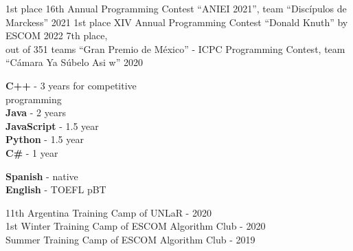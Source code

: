 \documentclass[9pt]{developercv} %
\begin{document}


\begin{entrylist}
	\entry
		{1st place}
		{16th Annual Programming Contest ``ANIEI 2021'', team ``Discípulos de Marckess''}
		{2021}
		{}
	\entry
		{1st place}
		{XIV Annual Programming Contest ``Donald Knuth'' by ESCOM}
		{2022}
		{}
	\entry
		{7th place,\\out of 351 teams}
		{``Gran Premio de México'' - ICPC Programming Contest, team ``Cámara Ya Súbelo Asi w''}
		{2020}
		{}
\end{entrylist}


\begin{minipage}[t]{0.25\textwidth}
	\vspace{-\baselineskip} %

	
	\textbf{C++} - 3 years for competitive\\
	programming\\
	\textbf{Java} - 2 years\\
	\textbf{JavaScript} - 1.5 year\\
	\textbf{Python} - 1.5 year\\
	\textbf{C\#} - 1 year
\end{minipage}
\hfill
\begin{minipage}[t]{0.17\textwidth}
	\vspace{-\baselineskip} %
	
	
	\textbf{Spanish} - native\\
	\textbf{English} - TOEFL pBT
\end{minipage}
\hfill
\begin{minipage}[t]{0.48\textwidth}
	\vspace{-\baselineskip} %
	
	
	11th Argentina Training Camp of UNLaR - 2020\\
	1st Winter Training Camp of ESCOM Algorithm Club - 2020\\
	Summer Training Camp of ESCOM Algorithm Club - 2019
\end{minipage}

\end{document}

